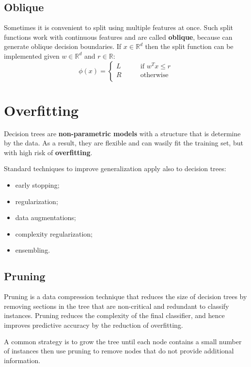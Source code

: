 \subsection{Oblique}
Sometimes it is convenient to split using multiple features at once. Such split functions work with continuous features and are called \textbf{oblique}, because can generate oblique decision boundaries. If \(x \in \mathbb{R}^d\) then the split function can be implemented given \(w \in \mathbb{R}^d\) and \(r \in \mathbb{R}\):
\begin{equation}
    \phi(x) = \begin{cases}
        L \qquad &\text{if }w^Tx \leq r \\
        R \qquad &\text{otherwise} \\
    \end{cases}
\end{equation}

\section{Overfitting}
Decision trees are \textbf{non-parametric models} with a structure that is determine by the data. As a result, they are flexible and can wasily fit the training set, but with high risk of \textbf{overfitting}. 

Standard techniques to improve generalization apply also to decision trees:
\begin{itemize}
    \item early stopping;
    \item regularization;
    \item data augmentations;
    \item complexity regularization;
    \item ensembling.
\end{itemize}

\subsection{Pruning}
Pruning is a data compression technique that reduces the size of decision trees by removing sections in the tree that are non-critical and redundant to classify instances. Pruning reduces the complexity of the final classifier, and hence improves predictive accuracy by the reduction of overfitting.

A common strategy is to grow the tree until each node contains a small number of instances then use pruning to remove nodes that do not provide additional information.

